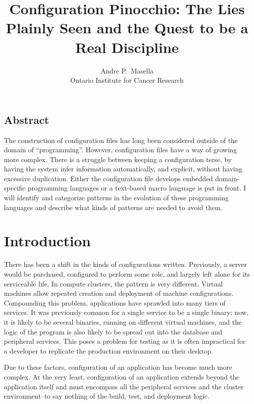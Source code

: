 \documentclass[letterpaper,twocolumn,10pt]{article}
\begin{document}
\date{}
\title{\Large \bf Configuration Pinocchio: The Lies Plainly Seen and the Quest to be a Real Discipline}

\author{
{\rm Andre P.~Masella}\\
Ontario Institute for Cancer Research
} %

\maketitle

\thispagestyle{empty}


\subsection*{Abstract}
The construction of configuration files has long been considered outside of the domain of ``programming''. However, configuration files have a way of growing more complex. There is a struggle between keeping a configuration terse, by having the system infer information automatically, and explicit, without having excessive duplication. Either the configuration file develops embedded domain-specific programming languages or a text-based macro language is put in front. I will identify and categorize patterns in the evolution of these programming languages and describe what kinds of patterns are needed to avoid them.

\section{Introduction}
There has been a shift in the kinds of configurations written. Previously, a server would be purchased, configured to perform some role, and largely left alone for its serviceable life. In compute clusters, the pattern is very different. Virtual machines allow repeated creation and deployment of machine configurations. Compounding this problem, applications have sprawled into many tiers of services. It was previously common for a single service to be a single binary; now, it is likely to be several binaries, running on different virtual machines, and the logic of the program is also likely to be spread out into the database and peripheral services. This poses a problem for testing as it is often impractical for a developer to replicate the production environment on their desktop.

Due to these factors, configuration of an application has become much more complex. At the very least, configuration of an application extends beyond the application itself and must encompass all the peripheral services and the cluster environment--to say nothing of the build, test, and deployment logic.
\end{document}
